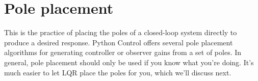 \section{Pole placement}

This is the practice of placing the poles of a closed-loop \gls{system} directly
to produce a desired response. Python Control offers several pole placement
algorithms for generating controller or observer gains from a set of poles. In
general, pole placement should only be used if you know what you're doing. It's
much easier to let LQR place the poles for you, which we'll discuss next.
